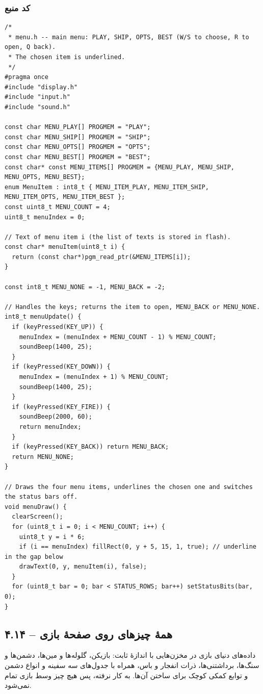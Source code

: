\documentclass[11pt,a4paper]{article}
\begin{document}
\subsubsection*{کد منبع}
\begin{latin}
\begin{lstlisting}[language=Arduino]
/*
 * menu.h -- main menu: PLAY, SHIP, OPTS, BEST (W/S to choose, R to open, Q back).
 * The chosen item is underlined.
 */
#pragma once
#include "display.h"
#include "input.h"
#include "sound.h"

const char MENU_PLAY[] PROGMEM = "PLAY";
const char MENU_SHIP[] PROGMEM = "SHIP";
const char MENU_OPTS[] PROGMEM = "OPTS";
const char MENU_BEST[] PROGMEM = "BEST";
const char* const MENU_ITEMS[] PROGMEM = {MENU_PLAY, MENU_SHIP, MENU_OPTS, MENU_BEST};
enum MenuItem : int8_t { MENU_ITEM_PLAY, MENU_ITEM_SHIP, MENU_ITEM_OPTS, MENU_ITEM_BEST };
const uint8_t MENU_COUNT = 4;
uint8_t menuIndex = 0;

// Text of menu item i (the list of texts is stored in flash).
const char* menuItem(uint8_t i) {
  return (const char*)pgm_read_ptr(&MENU_ITEMS[i]);
}

const int8_t MENU_NONE = -1, MENU_BACK = -2;

// Handles the keys; returns the item to open, MENU_BACK or MENU_NONE.
int8_t menuUpdate() {
  if (keyPressed(KEY_UP)) {
    menuIndex = (menuIndex + MENU_COUNT - 1) % MENU_COUNT;
    soundBeep(1400, 25);
  }
  if (keyPressed(KEY_DOWN)) {
    menuIndex = (menuIndex + 1) % MENU_COUNT;
    soundBeep(1400, 25);
  }
  if (keyPressed(KEY_FIRE)) {
    soundBeep(2000, 60);
    return menuIndex;
  }
  if (keyPressed(KEY_BACK)) return MENU_BACK;
  return MENU_NONE;
}

// Draws the four menu items, underlines the chosen one and switches the status bars off.
void menuDraw() {
  clearScreen();
  for (uint8_t i = 0; i < MENU_COUNT; i++) {
    uint8_t y = i * 6;
    if (i == menuIndex) fillRect(0, y + 5, 15, 1, true); // underline in the gap below
    drawText(0, y, menuItem(i), false);
  }
  for (uint8_t bar = 0; bar < STATUS_ROWS; bar++) setStatusBits(bar, 0);
}
\end{lstlisting}

\end{latin}

\clearpage
\subsection*{۴.۱۴  – همهٔ چیزهای روی صفحهٔ بازی}
داده‌های دنیای بازی در مخزن‌هایی با اندازهٔ ثابت: بازیکن، گلوله‌ها و مین‌ها، دشمن‌ها و سنگ‌ها، برداشتنی‌ها، ذرات انفجار و باس، همراه با جدول‌های سه سفینه و انواع دشمن و توابع کمکی کوچک برای ساختن آن‌ها.  به کار نرفته، پس هیچ چیز وسط بازی تمام نمی‌شود.
\end{document}
